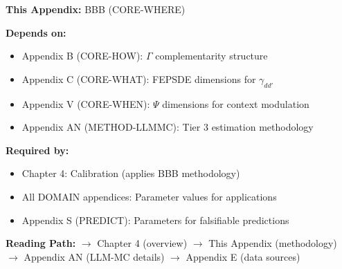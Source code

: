 \begin{tcolorbox}[colback=gray!10!white, colframe=gray!75!black,
    title=\textbf{Cross-Reference Footer}]

\textbf{This Appendix:} BBB (CORE-WHERE)

\textbf{Depends on:}
\begin{itemize}[nosep]
    \item Appendix B (CORE-HOW): $\Gamma$ complementarity structure
    \item Appendix C (CORE-WHAT): FEPSDE dimensions for $\gamma_{dd'}$
    \item Appendix V (CORE-WHEN): $\Psi$ dimensions for context modulation
    \item Appendix AN (METHOD-LLMMC): Tier 3 estimation methodology
\end{itemize}

\textbf{Required by:}
\begin{itemize}[nosep]
    \item Chapter 4: Calibration (applies BBB methodology)
    \item All DOMAIN appendices: Parameter values for applications
    \item Appendix S (PREDICT): Parameters for falsifiable predictions
\end{itemize}

\textbf{Reading Path:}
$\rightarrow$ Chapter 4 (overview) $\rightarrow$ This Appendix (methodology)
$\rightarrow$ Appendix AN (LLM-MC details) $\rightarrow$ Appendix E (data sources)

\end{tcolorbox}

